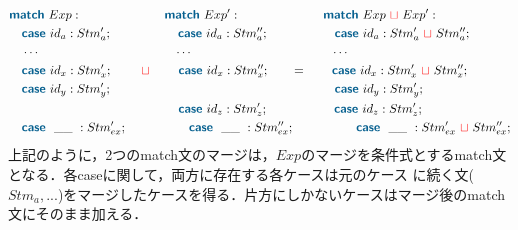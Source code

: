 \documentclass{thesis}
\newcommand{\projection}[2]{{\color{cyan}\llparenthesis}#1{\color{cyan}\rrparenthesis^#2}}
\newcommand{\mblue}[1]{\textbf{\textsf{\color{MidnightBlue}#1}}}
\newcommand{\nl}[1]{{\color{red}{\llbracket}}#1{\color{red}{\rrbracket}}} %
\newcommand{\mg}{~{\color{red}{\sqcup}}~} %
\begin{document}
\begin{alignat*}{2} 
  & \mblue{match}~Exp: ~~~~~~~~~~~~~~~~~~~~\mblue{match}~Exp': ~~~~~~~~~~~~~~~~~~~~\mblue{match}~Exp \mg Exp':\\
  & ~~~\mblue{case}~id_a : Stm'_a; ~~~~~~~~~~~~~~~~\mblue{case}~id_a : Stm''_a; ~~~~~~~~~~~~~~~~\mblue{case}~id_a : Stm'_a \mg Stm''_a;\\
  & ~~~\cdots ~~~~~~~~~~~~~~~~~~~~~~~~~~~~~~~~~\cdots ~~~~~~~~~~~~~~~~~~~~~~~~~~~~~~~~~~\cdots\\
  & ~~~\mblue{case}~id_x : Stm'_x; ~~~~~~\mg~~~~~~\mblue{case}~id_x : Stm''_x; ~~~~~~=~~~~~~\mblue{case}~id_x : Stm'_x \mg Stm''_x;\\
  & ~~~\mblue{case}~id_y : Stm'_y; ~~~~~~~~~~~~~~~~~~~~~~~~~~~~~~~~~~~~~~~~~~~~~~~~~~~~~~\mblue{case}~id_y : Stm'_y; \\
  & ~~~~~~~~~~~~~~~~~~~~~~~~~~~~~~~~~~~~~~~~~\mblue{case}~id_z : Stm'_z;~~~~~~~~~~~~~~~~\mblue{case}~id_z : Stm'_z;\\
  & ~~~\mblue{case}~~\_\_ ~: Stm'_{ex}; ~~~~~~~~~~~~~~~\mblue{case}~~\_\_ ~: Stm''_{ex}; ~~~~~~~~~~~~~~~\mblue{case}~~\_\_ ~:Stm'_{ex} \mg Stm''_{ex};\\
\end{alignat*}
上記のように，2つのmatch文のマージは，$Exp$のマージを条件式とするmatch文となる．各caseに関して，両方に存在する各ケースは元のケース
に続く文($Stm_a,...$)をマージしたケースを得る．片方にしかないケースはマージ後のmatch文にそのまま加える．

%
\end{document}
